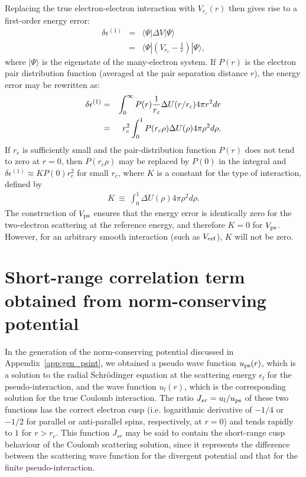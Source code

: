 Replacing the true electron-electron interaction with $V_{r_c}(r)$ then
gives rise to a first-order energy error:
\begin{eqnarray}
\delta\epsilon^{(1)} & = & \langle \Psi |\Delta V| \Psi \rangle  \nonumber \\
 & = & \langle\Psi|\left(V_{r_c} - \frac{1}{r}\right)|\Psi\rangle,
\label{eq:firstord}
\end{eqnarray}
where $|\Psi\rangle$ is the eigenstate of the many-electron system.
If $P(r)$ is the electron pair distribution function (averaged at
the pair separation distance $r$), the energy error may be rewritten as:
\begin{eqnarray}
\delta\epsilon^{(1)} & = & 
\int_{0}^{\infty} P(r) {1\over r_c} \Delta U(r/r_c) 4\pi r^2 dr \nonumber \\
                     & = & 
r^2_c \int_{0}^{1} P(r_c\rho) \Delta U(\rho) 4\pi \rho^2 d\rho .
\label{eq:firstordn}
\end{eqnarray}
If $r_c$ is sufficiently small and the pair-distribution function $P(r)$
does not tend to zero at $r=0$, then $P(r_c\rho)$ may be replaced by $P(0)$
in the integral and $ \delta\epsilon^{(1)}  \approx K P(0) r_c^2 $ for small
$r_c$, where $K$ is a constant for the type of interaction, defined by
\begin{eqnarray}
K    ~\equiv~    \int_{0}^{1} \Delta U(\rho) 4\pi \rho^2 d\rho .
\label{eq:Kdef}
\end{eqnarray}
The construction of $V_{\rm ps}$ ensures that the energy error is
identically zero for the two-electron scattering at the reference
energy, and therefore $K = 0$ for $V_{\rm ps}$.
However, for an arbitrary smooth interaction (such as $V_{\rm erf}$), 
$K$ will not be zero.



%
%
\section{Short-range correlation term obtained from norm-conserving potential}
\label{app:srjast}
%
%

In the generation of the norm-conserving potential discussed in
Appendix~\ref{app:gen_psint}, we obtained a pseudo wave function 
$u_{\rm ps}(r)$, which is a solution to the radial Schr\"odinger 
equation at the scattering energy $\epsilon_l$ for the pseudo-interaction, 
and the wave function $u_l(r)$, which is the corresponding solution 
for the true Coulomb interaction.
The ratio $J_{sr} = u_l/u_{\rm ps}$ of these two functions has the correct 
electron cusp (i.e. logarithmic derivative of $-1/4$ or $-1/2$ for
parallel or anti-parallel spins, respectively, at $r=0$) and tends
rapidly to $1$ for $r>r_c$. 
This function $J_{sr}$ may be said to contain the short-range cusp 
behaviour of the Coulomb scattering solution, since it represents the 
difference between the scattering wave function for the divergent 
potential and that for the finite pseudo-interaction.

